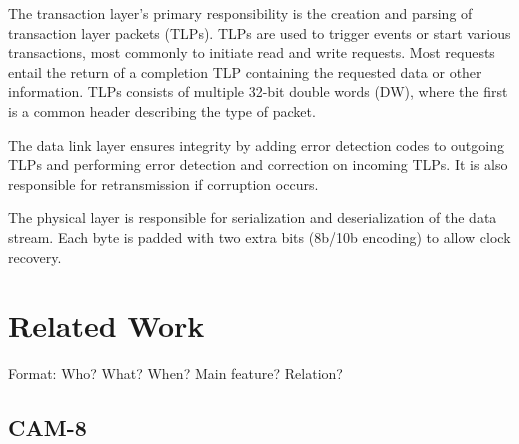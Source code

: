 The transaction layer's primary responsibility is the creation and parsing of transaction layer packets (TLPs).
TLPs are used to trigger events or start various transactions, most commonly to initiate read and write requests\footnotemark.
Most requests entail the return of a completion TLP containing the requested data or other information.
TLPs consists of multiple 32-bit double words (DW), where the first is a common header describing the type of packet.

The data link layer ensures integrity by adding error detection codes to outgoing TLPs and performing error detection and correction on incoming TLPs.
It is also responsible for retransmission if corruption occurs.

The physical layer is responsible for serialization and deserialization of the data stream.
Each byte is padded with two extra bits (8b/10b encoding) to allow clock recovery.


\section{Related Work}

\TODO

Format: Who? What? When? Main feature? Relation?

\subsection{CAM-8}

